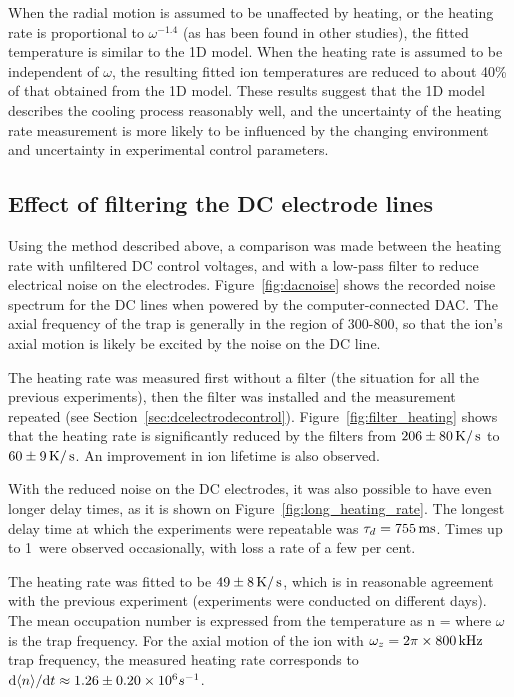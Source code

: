 When the radial motion is assumed to be unaffected by heating, or the heating rate is proportional to $\omega^{-1.4}$ (as has been found in other studies), the fitted temperature is similar to the 1D model. When the heating rate is assumed to be independent of $\omega$, the resulting fitted ion temperatures are reduced to about 40\% of that obtained from the 1D model. These results suggest that the 1D model describes the cooling process reasonably well, and the uncertainty of the heating rate measurement is more likely to be influenced by the changing environment and uncertainty in experimental control parameters.


\subsection{Effect of filtering the DC electrode lines}
\label{sec:filternoise}

Using the method described above, a comparison was made between the heating rate with unfiltered DC control voltages, and with a low-pass filter to reduce electrical noise on the electrodes. Figure~\ref{fig:dacnoise} shows the recorded noise spectrum for the DC lines when powered by the computer-connected DAC. The axial frequency of the trap is generally in the region of 300-800\kHz, so that the ion's axial motion is likely be excited by the noise on the DC line.

The heating rate was measured first without a filter (the situation for all the previous experiments), then the filter was installed and the measurement repeated (see Section~\ref{sec:dcelectrodecontrol}). Figure~\ref{fig:filter_heating} shows that the heating rate is significantly reduced by the filters from $206\pm80\,\mbox{K}/\,\mbox{s}$ to $60\pm9\,\mbox{K}/\,\mbox{s}$. An improvement in ion lifetime is also observed.

With the reduced noise on the DC electrodes, it was also possible to have even longer delay times, as it is shown on Figure~\ref{fig:long_heating_rate}. The longest delay time at which the experiments were repeatable was $\tau_d = 755\,\mbox{ms}$. Times up to 1\s\, were observed occasionally, with loss a rate of a few per cent. 

The heating rate was fitted to be $49\pm8\,\mbox{K}/\,\mbox{s}$, which is in reasonable agreement with the previous experiment (experiments were conducted on different days). The mean occupation number is expressed from the temperature as
\be
\langle n \rangle = 
\ee
where $\omega$ is the trap frequency. For the axial motion of the ion with $\omega_{z} = 2\pi \times 800\,\mbox{kHz}$ trap frequency, the measured heating rate corresponds to $\mbox{d}\langle n \rangle/\mbox{d} t\approx1.26\pm0.20\times10^{6}s^{-1}$. 

